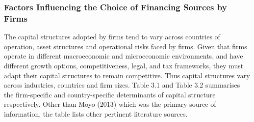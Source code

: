 \documentclass[a4paper, nobind]{templates/ociamthesis}
\begin{document}
\hypertarget{factors-influencing-the-choice-of-financing-sources-by-firms}{%
\subsubsection{Factors Influencing the Choice of Financing Sources by Firms}\label{factors-influencing-the-choice-of-financing-sources-by-firms}}

The capital structures adopted by firms tend to vary across countries of operation, asset structures and operational risks faced by firms. Given that firms operate in different macroeconomic and microeconomic environments, and have different growth options, competitiveness, legal, and tax frameworks, they must adapt their capital structures to remain competitive. Thus capital structures vary across industries, countries and firm sizes. Table 3.1 and Table 3.2 summarises the firm-specific and country-specific determinants of capital structure respectively. Other than Moyo (2013) which was the primary source of information, the table lists other pertinent literature sources.
\end{document}
